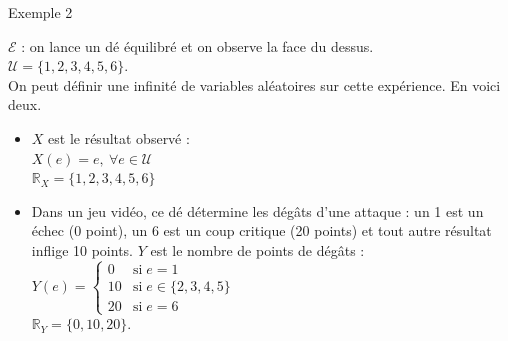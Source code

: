 \documentclass{BeamerTemplate}
\begin{document}
\begin{frame}[t,label=ex2]{Exemple 2}

$\mathcal{E}$ : on lance un dé équilibré et on observe la face du dessus. \\
$\mathcal{U}=\{1,2,3,4,5,6\}$.\\
On peut définir une infinité de variables aléatoires sur cette expérience.
En voici deux.

 \begin{itemize}
  \item<2-> $X$ est le résultat observé :\\
    $X(e)=e,~\forall e\in \mathcal{U}$\\
    $\mathbb{R}_X=\{1,2,3,4,5,6\}$
  \item<3-> Dans un jeu vidéo, ce dé détermine les dégâts d'une attaque : un 1 est un échec (0 point), un 6 est un coup critique (20 points) et tout autre résultat inflige 10 points.
    $Y$ est le nombre de points de dégâts :\\
      $Y(e)=\left\{
  \begin{array}{rl}
  0 &\text{si}\;e=1\\
  10 &\text{si}\;e\in\{2,3,4,5\}\\
  20 &\text{si}\;e=6
  \end{array}
  \right.$\\
  $\mathbb{R}_Y=\{0,10,20\}$.
 \end{itemize}
\end{frame}
\end{document}
